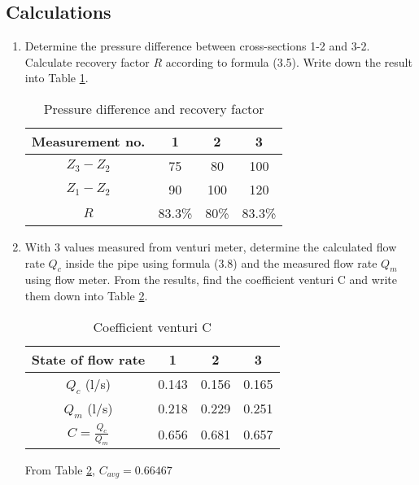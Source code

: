 \subsection{Calculations}
\begin{enumerate}
	\item Determine the pressure difference between cross-sections 1-2 and 3-2. Calculate recovery factor $R$ according to formula (3.5). Write down the result into Table \ref{tab2lab3c}.\\
	\begin{table}[h]
		\centering
		\begin{tabular}{|c|c|c|c|}
			\hline
			Measurement no. & 1 & 2 & 3	\\ \hline
			$Z_3-Z_2$ 		& 75& 80 & 100 	\\ \hline
			$Z_1-Z_2$ 		& 90	& 100	& 120 	\\ \hline
			$R$ 			& 83.3\%	& 80\% 	& 83.3\%	\\ \hline
		\end{tabular}
		\caption{Pressure difference and recovery factor}
		\label{tab2lab3c}
	\end{table}
	\item With 3 values measured from venturi meter, determine the calculated flow rate $Q_c$ inside the pipe using formula (3.8) and the measured flow rate $Q_m$ using flow meter. From the results, find the coefficient venturi C and write them down into Table \ref{tab3lab3c}.
	\newpage
	\begin{table}[h]
		\centering
		\begin{tabular}{|c|c|c|c|}
			\hline
			State of flow rate 		&  1  	&  2  	&  3 \\ \hline
			$Q_c$ (l/s)				&	0.143	&	0.156	&0.165	 \\ \hline
			$Q_m$ (l/s)				&	0.218	&0.229		&	0.251	\\ \hline
			$C = \frac{Q_c}{Q_m}$	&	0.656	&0.681		&0.657	\\	\hline
		\end{tabular}
		\caption{Coefficient venturi C}
		\label{tab3lab3c}
	\end{table}
	From Table \ref{tab3lab3c}, $C_{avg}=0.66467$
\end{enumerate}

